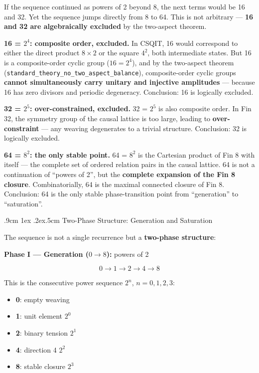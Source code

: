 \documentclass[aps,prd,twocolumn,nofootinbib,floatfix]{revtex4-2}
\makeatletter
\def\subsection{%
  \@startsection{subsection}{2}{\z@}
    {.9cm \@plus1ex \@minus .2ex}{.5cm}
    {\normalfont\normalsize\bfseries\centering}%
}
\makeatother
\begin{document}
If the sequence continued as powers of 2 beyond 8, the next terms would be 16 and 32. Yet the sequence jumps directly from 8 to 64. This is not arbitrary --- \textbf{16 and 32 are algebraically excluded} by the two-aspect theorem.

\textbf{16 = $2^4$: composite order, excluded.} In CSQIT, 16 would correspond to either the direct product $8 \times 2$ or the square $4^2$, both intermediate states. But 16 is a composite-order cyclic group ($16 = 2^4$), and by the two-aspect theorem (\texttt{standard\_theory\_no\_two\_aspect\_balance}), composite-order cyclic groups \textbf{cannot simultaneously carry unitary and injective amplitudes} --- because 16 has zero divisors and periodic degeneracy. Conclusion: 16 is logically excluded.

\textbf{32 = $2^5$: over-constrained, excluded.} 32 = $2^5$ is also composite order. In Fin 32, the symmetry group of the causal lattice is too large, leading to \textbf{over-constraint} --- any weaving degenerates to a trivial structure. Conclusion: 32 is logically excluded.

\textbf{64 = $8^2$: the only stable point.} 64 = $8^2$ is the Cartesian product of Fin 8 with itself --- the complete set of ordered relation pairs in the causal lattice. 64 is not a continuation of ``powers of 2'', but the \textbf{complete expansion of the Fin 8 closure}. Combinatorially, 64 is the maximal connected closure of Fin 8. Conclusion: 64 is the only stable phase-transition point from ``generation'' to ``saturation''.

\subsection{Two-Phase Structure: Generation and Saturation}

The sequence is not a single recurrence but a \textbf{two-phase structure}:

\textbf{Phase I --- Generation ($0 \to 8$):} powers of 2

\[
0 \to 1 \to 2 \to 4 \to 8
\]

This is the consecutive power sequence $2^n$, $n = 0, 1, 2, 3$:
\begin{itemize}
    \item \textbf{0}: empty weaving
    \item \textbf{1}: unit element $2^0$
    \item \textbf{2}: binary tension $2^1$
    \item \textbf{4}: direction 4 $2^2$
    \item \textbf{8}: stable closure $2^3$
\end{itemize}
\end{document}
